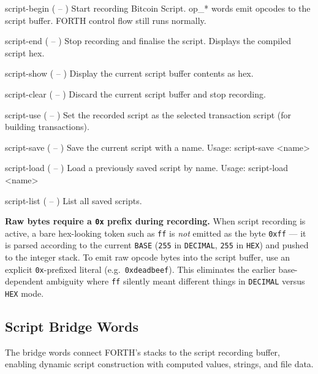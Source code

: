 \documentclass[a4paper, 11pt, openany]{book}
\begin{document}
\begin{forthbox}
  script-begin  ( -- )
                Start recording Bitcoin Script. op_* words emit
                opcodes to the script buffer. FORTH control flow
                still runs normally.

  script-end    ( -- )
                Stop recording and finalise the script. Displays
                the compiled script hex.

  script-show   ( -- )
                Display the current script buffer contents as hex.

  script-clear  ( -- )
                Discard the current script buffer and stop
                recording.

  script-use    ( -- )
                Set the recorded script as the selected transaction
                script (for building transactions).

  script-save   ( -- )
                Save the current script with a name.
                Usage: script-save <name>

  script-load   ( -- )
                Load a previously saved script by name.
                Usage: script-load <name>

  script-list   ( -- )
                List all saved scripts.
\end{forthbox}

\begin{notebox}
\textbf{Raw bytes require a \texttt{0x} prefix during recording.} When script recording is active, a bare hex-looking token such as \texttt{ff} is \emph{not} emitted as the byte \texttt{0xff} --- it is parsed according to the current \texttt{BASE} (\texttt{255} in \texttt{DECIMAL}, \texttt{255} in \texttt{HEX}) and pushed to the integer stack. To emit raw opcode bytes into the script buffer, use an explicit \texttt{0x}-prefixed literal (e.g.\ \texttt{0xdeadbeef}). This eliminates the earlier base-dependent ambiguity where \texttt{ff} silently meant different things in \texttt{DECIMAL} versus \texttt{HEX} mode.
\end{notebox}

\subsection{Script Bridge Words}

The bridge words connect FORTH's stacks to the script recording buffer, enabling dynamic script construction with computed values, strings, and file data.
\end{document}
